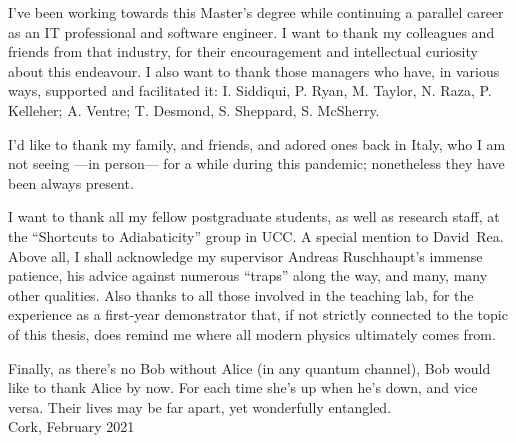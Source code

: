 I've been working towards this Master's degree
while continuing a parallel career
as an IT professional and software engineer.
I want to thank my
colleagues and friends from that industry, for their encouragement
and intellectual curiosity
about this endeavour.
I also want to thank those managers
who have, in various ways, supported and facilitated it:
I. Siddiqui, P. Ryan, M. Taylor, N. Raza, P. Kelleher;
A. Ventre;
T. Desmond, S. Sheppard, S. McSherry.

I'd like to thank my family, and friends, and adored ones back in Italy,
who I am not seeing ---in person--- for a while during this pandemic;
nonetheless they have been always present.

I want to thank all my fellow postgraduate students,
as well as research staff,
at the ``Shortcuts to Adiabaticity'' group in UCC.
A special mention to David~Rea.
Above all, I shall acknowledge my supervisor Andreas Ruschhaupt's immense patience,
his advice against numerous ``traps'' along the way, and many, many other qualities.
Also thanks to all those involved in the teaching lab, for the experience as a
first-year demonstrator that,
if not strictly connected to the topic of this thesis,
does remind me where all modern physics ultimately comes from.

Finally, as there's no Bob without Alice (in any quantum channel),
Bob would like to thank Alice by now.
For each time she's up when he's down,
and vice versa.
Their lives may be far apart,
yet wonderfully entangled.
\\

{Cork, February 2021}

